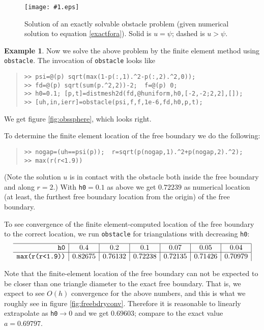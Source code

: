 \documentclass[12pt,final]{amsart}
\newcommand{\regfigure}[2]{\texttt{[image: \#1.eps]}}
\newcommand{\mtt}{\texttt}
\theoremstyle{definition}
\newtheorem{example}{Example}
\begin{document}
\begin{figure}[ht]
\regfigure{easyobs}{2.5}
\caption{Solution of an exactly solvable obstacle problem (given numerical solution to equation \eqref{exactfora}).  Solid is $u=\psi$; dashed is $u>\psi$.} \label{fig:easyobs}
\end{figure}

\begin{example}  Now we solve the above problem by the finite element method using \mtt{obstacle}.  The invocation of \mtt{obstacle} looks like
\small\begin{quote}\begin{verbatim}
>> psi=@(p) sqrt(max(1-p(:,1).^2-p(:,2).^2,0));
>> fd=@(p) sqrt(sum(p.^2,2))-2;  f=@(p) 0;
>> h0=0.1; [p,t]=distmesh2d(fd,@huniform,h0,[-2,-2;2,2],[]);
>> [uh,in,ierr]=obstacle(psi,f,f,1e-6,fd,h0,p,t);
\end{verbatim}
\end{quote}\normalsize
We get figure \ref{fig:obssphere}, which looks right.

To determine the finite element location of the free boundary we do the following:
\small\begin{quote}\begin{verbatim}
>> nogap=(uh==psi(p));  r=sqrt(p(nogap,1).^2+p(nogap,2).^2);
>> max(r(r<1.9))
\end{verbatim}
\end{quote}\normalsize
(Note the solution $u$ is in contact with the obstacle both inside the free boundary and along $r=2$.)  With \mtt{h0}$=0.1$ as above we get $0.72239$ as numerical location (at least, the furthest free boundary location from the origin) of the free boundary.

To see convergence of the finite element-computed location of the free boundary to the correct location, we run \mtt{obstacle} for triangulations with decreasing \mtt{h0}:
    $$\begin{array}{r|c|c|c|c|c|c|} \hline
     \text{\mtt{h0}} & 0.4 &0.2 &0.1 & 0.07 &0.05 &0.04 \\ \hline \text{\mtt{max(r(r<1.9))}} & 0.82675 & 0.76132 & 0.72238 & 0.72135 & 0.71426 & 0.70979 \end{array}$$

Note that the finite-element location of the free boundary can not be expected to be closer than one triangle diameter to the exact free boundary.  That is, we expect to see $O(h)$ convergence for the above numbers, and this is what we roughly see in figure \ref{fig:freebdryconv}.  Therefore it is reasonable to linearly extrapolate as \mtt{h0}$\to 0$ and we get $0.69603$; compare to the exact value $a=0.69797$.


\end{example}
\end{document}
